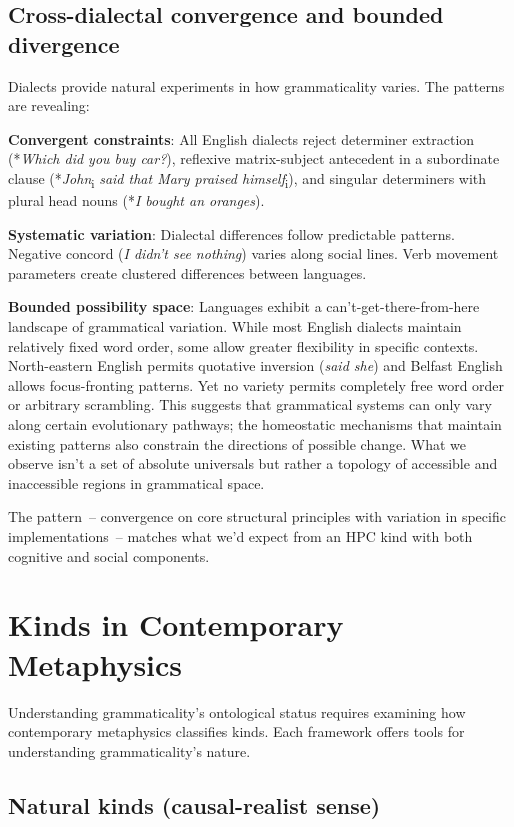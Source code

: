 \documentclass[12pt]{article}
\begin{document}
\subsection{Cross-dialectal convergence and bounded divergence}

Dialects provide natural experiments in how grammaticality varies. The patterns are revealing:

\textbf{Convergent constraints}: All English dialects reject determiner extraction (*\textit{Which did you buy car?}), reflexive matrix-subject antecedent in a subordinate clause (*\textit{John}\textsubscript{i} \textit{said that Mary praised himself}\textsubscript{i}), and singular determiners with plural head nouns (*\textit{I bought an oranges}).

\textbf{Systematic variation}: Dialectal differences follow predictable patterns. Negative concord (\textit{I didn't see nothing}) varies along social lines. Verb movement parameters create clustered differences between languages.

\textbf{Bounded possibility space}: Languages exhibit a can't-get-there-from-here landscape of grammatical variation. While most English dialects maintain relatively fixed word order, some allow greater flexibility in specific contexts. North-eastern English permits quotative inversion (\textit{said she}) and Belfast English allows focus-fronting patterns. Yet no variety permits completely free word order or arbitrary scrambling. This suggests that grammatical systems can only vary along certain evolutionary pathways; the homeostatic mechanisms that maintain existing patterns also constrain the directions of possible change. What we observe isn't a set of absolute universals but rather a topology of accessible and inaccessible regions in grammatical space.

The pattern~-- convergence on core structural principles with variation in specific implementations~-- matches what we'd expect from an HPC kind with both cognitive and social components.

\section{Kinds in Contemporary Metaphysics}

Understanding grammaticality's ontological status requires examining how contemporary metaphysics classifies kinds. Each framework offers tools for understanding grammaticality's nature.

\subsection{Natural kinds (causal-realist sense)}
\end{document}

